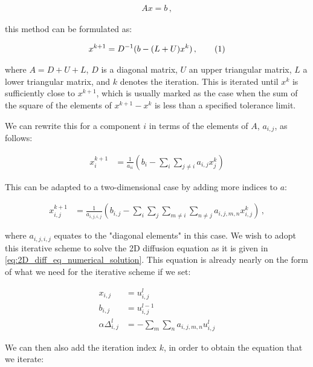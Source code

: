 \documentclass[reprint,english,notitlepage]{revtex4-1}  %
\newcommand\numberthis{\addtocounter{equation}{1}\tag{\theequation}}
\begin{document}
\begin{align*}
Ax = b \, ,
\end{align*}

this method can be formulated as:

\begin{align*}
x^{k+1} = D^{-1}(b - (L+U)x^k) \, , \numberthis \label{eq:jacobi_iterative_method}
\end{align*}

where $A = D + U + L$, $D$ is a diagonal matrix, $U$ an upper triangular matrix, $L$ a lower triangular matrix, and $k$ denotes the iteration. This is iterated until $x^k$ is sufficiently close to $x^{k+1}$, which is usually marked as the case when the sum of the square of the elements of $x^{k+1} - x^k$ is less than a specified tolerance limit. 


We can rewrite this for a component $i$ in terms of the elements of $A$, $a_{i,j}$, as follows:

\begin{align*}
x^{k+1}_i &= \frac{1}{a_{ii}} ( b_i - \sum\limits_i \sum\limits_{j\neq i} a_{i,j} x_j^k)
\end{align*}

This can be adapted to a two-dimensional case by adding more indices to $a$:

\begin{align*}
x_{i,j}^{k+1} &= \frac{1}{a_{i,j,i,j}} (b_{i,j} - \sum\limits_i \sum\limits_j \sum\limits_{m\neq i} \sum\limits_{n \neq j} a_{i,j,m,n} x_{i,j}^k ) \, ,
\end{align*}

where $a_{i,j,i,j}$ equates to the "diagonal elements" in this case. We wish to adopt this iterative scheme to solve the 2D diffusion equation as it is given in \eqref{eq:2D_diff_eq_numerical_solution}. This equation is already nearly on the form of what we need for the iterative scheme if we set:

\begin{align*}
x_{i,j} &= u_{i,j}^l \\
b_{i,j} &= u_{i,j}^{l-1} \\
\alpha \Delta_{i,j}^l &= -\sum\limits_m \sum\limits_n a_{i,j,m,n}  u_{i,j}^l
\end{align*} 

We can then also add the iteration index $k$, in order to obtain the equation that we iterate:
\end{document}

